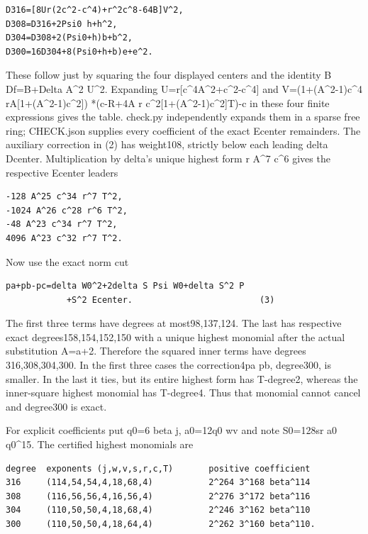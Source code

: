 \begingroup\small
\begin{verbatim}
D316=[8Ur(2c^2-c^4)+r^2c^8-64B]V^2,
D308=D316+2Psi0 h+h^2,
D304=D308+2(Psi0+h)b+b^2,
D300=16D304+8(Psi0+h+b)e+e^2.
\end{verbatim}
\endgroup

These follow just by squaring the four displayed centers and the identity
B Df=B+Delta A\textasciicircum{}2 U\textasciicircum{}2. Expanding U=r[c\textasciicircum{}4A\textasciicircum{}2+c\textasciicircum{}2-c\textasciicircum{}4] and
V=(1+(A\textasciicircum{}2-1)c\textasciicircum{}4 rA[1+(A\textasciicircum{}2-1)c\textasciicircum{}2])
  *(c-R+4A r c\textasciicircum{}2[1+(A\textasciicircum{}2-1)c\textasciicircum{}2]T)-c
in these four finite expressions gives the table. check.py independently
expands them in a sparse free ring; CHECK.json supplies every coefficient of
the exact Ecenter remainders. The auxiliary correction in (2) has weight108,
strictly below each leading delta Dcenter. Multiplication by delta's unique
highest form r A\textasciicircum{}7 c\textasciicircum{}6 gives the respective Ecenter leaders

\begingroup\small
\begin{verbatim}
-128 A^25 c^34 r^7 T^2,
-1024 A^26 c^28 r^6 T^2,
-48 A^23 c^34 r^7 T^2,
4096 A^23 c^32 r^7 T^2.
\end{verbatim}
\endgroup

Now use the exact norm cut

\begingroup\small
\begin{verbatim}
pa+pb-pc=delta W0^2+2delta S Psi W0+delta S^2 P
            +S^2 Ecenter.                         (3)
\end{verbatim}
\endgroup

The first three terms have degrees at most98,137,124. The last has respective
exact degrees158,154,152,150 with a unique highest monomial after the actual
substitution A=a+2. Therefore the squared inner terms have degrees
316,308,304,300. In the first three cases the correction4pa pb, degree300,
is smaller. In the last it ties, but its entire highest form has T-degree2,
whereas the inner-square highest monomial has T-degree4. Thus that monomial
cannot cancel and degree300 is exact.

For explicit coefficients put q0=6 beta j, a0=12q0 wv and note
S0=128sr a0 q0\textasciicircum{}15. The certified highest monomials are

\begingroup\small
\begin{verbatim}
degree  exponents (j,w,v,s,r,c,T)       positive coefficient
316     (114,54,54,4,18,68,4)           2^264 3^168 beta^114
308     (116,56,56,4,16,56,4)           2^276 3^172 beta^116
304     (110,50,50,4,18,68,4)           2^246 3^162 beta^110
300     (110,50,50,4,18,64,4)           2^262 3^160 beta^110.
\end{verbatim}
\endgroup

